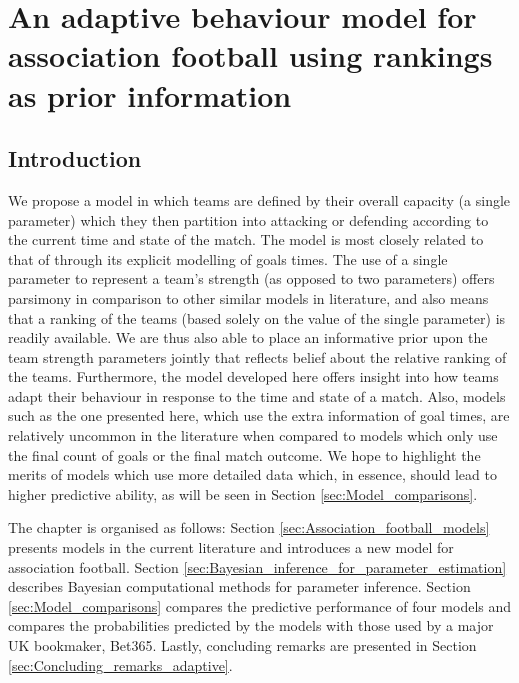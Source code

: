 
\singlespacing

\chapter{An adaptive behaviour model for association football using rankings as prior information} 
\label{ch:An_adaptive_behaviour_model_for_association_football_using_rankings_as_prior_information}

\onehalfspacing

\section{Introduction}

We propose a model in which teams are defined by their overall capacity (a single parameter) which they then partition
into attacking or defending according to the current time and state of the match. The model is most closely related to
that of \cite{DixonRobinson1998} through its explicit modelling of goals times. The use of a single parameter to
represent a team's strength (as opposed to two parameters) offers parsimony in comparison to other similar models in
literature, and also means that a ranking of the teams (based solely on the value of the single parameter) is readily
available. We are thus also able to place an informative prior upon the team strength parameters jointly that reflects
belief about the relative ranking of the teams. Furthermore, the model developed here offers insight into how teams
adapt their behaviour in response to the time and state of a match. Also, models such as the one presented here, which
use the extra information of goal times, are relatively uncommon in the literature when compared to models which only
use the final count of goals or the final match outcome. We hope to highlight the merits of models which use more
detailed data which, in essence, should lead to higher predictive ability, as will be seen in Section
\ref{sec:Model_comparisons}.

The chapter is organised as follows: Section \ref{sec:Association_football_models} presents models in the current
literature and introduces a new model for association football. Section
\ref{sec:Bayesian_inference_for_parameter_estimation} describes Bayesian computational methods for parameter inference.
Section \ref{sec:Model_comparisons} compares the predictive performance of four models and compares the probabilities
predicted by the models with those used by a major UK bookmaker, Bet365. Lastly, concluding remarks are presented in
Section \ref{sec:Concluding_remarks_adaptive}.

